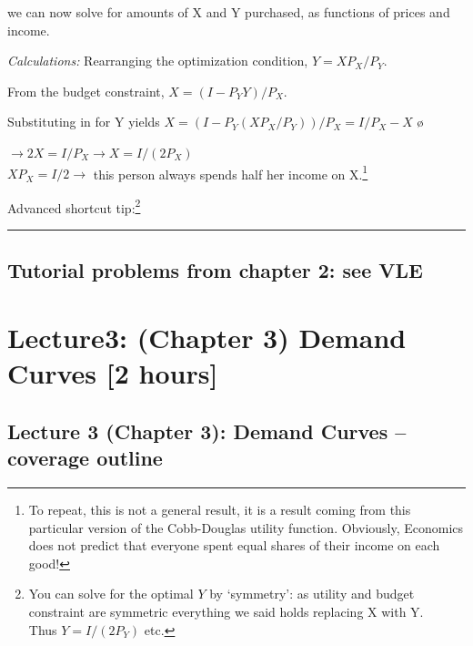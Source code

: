 \documentclass[]{article}
\begin{document}
we can now solve for amounts of X and Y purchased, as functions of
prices and income.

\emph{Calculations:} Rearranging the optimization condition,
\(Y = X P_X/P_Y\).\\

\smallskip

From the budget constraint, \(X = (I - P_Y Y)/P_X\).\\

\smallskip

Substituting in for Y yields
\(X = (I - P_Y(X P_X / P_Y))/P_X = I/P_X - X\) \o

\smallskip

\(\rightarrow 2X = I/P_X \rightarrow X = I/(2P_X)\)\\
\(X P_X = I / 2 \rightarrow\) this person always spends half her income
on X.\footnote{To repeat, this is not a general result, it is a result
  coming from this particular version of the Cobb-Douglas utility
  function. Obviously, Economics does not predict that everyone spent
  equal shares of their income on each good!}

\medskip

\textcolor{RawSienna}{Advanced shortcut tip:}\footnote{You can solve for
  the optimal \(Y\) by `symmetry': as utility and budget constraint are
  symmetric everything we said holds replacing X with Y.\\
  Thus \(Y = I/(2P_Y)\) etc.}

\begin{center}\rule{0.5\linewidth}{\linethickness}\end{center}

\hypertarget{tutorial-problems-from-chapter-2-see-vle}{%
\subsection{Tutorial problems from chapter 2: see
VLE}\label{tutorial-problems-from-chapter-2-see-vle}}

\hypertarget{lecture3-chapter-3-demand-curves-2-hours}{%
\section{Lecture3: (Chapter 3) Demand Curves {[}2
hours{]}}\label{lecture3-chapter-3-demand-curves-2-hours}}

\hypertarget{lecture-3-chapter-3-demand-curves-coverage-outline}{%
\subsection{Lecture 3 (Chapter 3): Demand Curves -- coverage
outline}\label{lecture-3-chapter-3-demand-curves-coverage-outline}}
\end{document}
